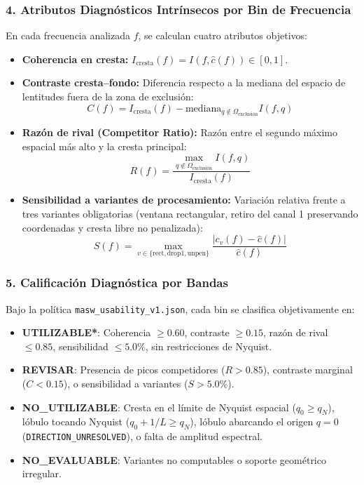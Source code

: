 \documentclass[11pt,a4paper]{article}
\begin{document}
\subsubsection{4. Atributos Diagnósticos Intrínsecos por Bin de Frecuencia}
En cada frecuencia analizada $f$, se calculan cuatro atributos objetivos:
\begin{itemize}
    \item \textbf{Coherencia en cresta:} $I_{\text{cresta}}(f) = I(f, \hat{c}(f)) \in [0, 1]$.
    \item \textbf{Contraste cresta--fondo:} Diferencia respecto a la mediana del espacio de lentitudes fuera de la zona de exclusión:
    \begin{equation}
        C(f) = I_{\text{cresta}}(f) - \text{mediana}_{q \notin \Omega_{\text{exclusión}}} I(f, q)
    \end{equation}
    \item \textbf{Razón de rival (Competitor Ratio):} Razón entre el segundo máximo espacial más alto y la cresta principal:
    \begin{equation}
        R(f) = \frac{\max_{q \notin \Omega_{\text{exclusión}}} I(f, q)}{I_{\text{cresta}}(f)}
    \end{equation}
    \item \textbf{Sensibilidad a variantes de procesamiento:} Variación relativa frente a tres variantes obligatorias (ventana rectangular, retiro del canal 1 preservando coordenadas y cresta libre no penalizada):
    \begin{equation}
        S(f) = \max_{v \in \{\text{rect}, \text{drop1}, \text{unpen}\}} \frac{|c_v(f) - \hat{c}(f)|}{\hat{c}(f)}
    \end{equation}
\end{itemize}

\subsubsection{5. Calificación Diagnóstica por Bandas}
Bajo la política \texttt{masw\_usability\_v1.json}, cada bin se clasifica objetivamente en:
\begin{itemize}
    \item \textcolor{usablegreen}{\textbf{UTILIZABLE*}}: Coherencia $\ge 0.60$, contraste $\ge 0.15$, razón de rival $\le 0.85$, sensibilidad $\le 5.0\%$, sin restricciones de Nyquist.
    \item \textcolor{reviewamber}{\textbf{REVISAR}}: Presencia de picos competidores ($R > 0.85$), contraste marginal ($C < 0.15$), o sensibilidad a variantes ($S > 5.0\%$).
    \item \textcolor{badred}{\textbf{NO\_UTILIZABLE}}: Cresta en el límite de Nyquist espacial ($q_0 \ge q_N$), lóbulo tocando Nyquist ($q_0 + 1/L \ge q_N$), lóbulo abarcando el origen $q=0$ (\texttt{DIRECTION\_UNRESOLVED}), o falta de amplitud espectral.
    \item \textcolor{unusablegrey}{\textbf{NO\_EVALUABLE}}: Variantes no computables o soporte geométrico irregular.
\end{itemize}
\end{document}

